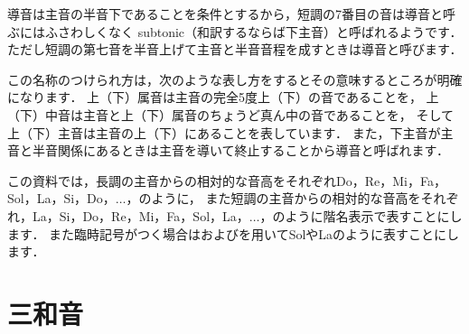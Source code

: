 \documentclass[dvipdfmx,uplatex,b5paper,openany,jbase=12Q,nomag*,textwidth-limit=44%
               ]{gachimuchi}[2020/05/05]
\begin{document}
導音は主音の半音下であることを条件とするから，短調の7番目の音は導音と呼ぶにはふさわしくなく
subtonic（和訳するならば下主音）と呼ばれるようです．
ただし短調の第七音を半音上げて主音と半音音程を成すときは導音と呼びます．

\begin{Music}
  \nostartrule%
  \Startpiece%
  \Notes%
  \en%
  \endpiece%
  \Startpiece%
  \Notes%
  \en%
  \endpiece%
\end{Music}

この名称のつけられ方は，次のような表し方をするとその意味するところが明確になります．
上（下）属音は主音の完全5度上（下）の音であることを，
上（下）中音は主音と上（下）属音のちょうど真ん中の音であることを，
そして上（下）主音は主音の上（下）にあることを表しています．
また，下主音が主音と半音関係にあるときは主音を導いて終止することから導音と呼ばれます．
\begin{Music}
  \nostartrule%
  \Startpiece%
  \Notes%
  \en%
  \endpiece%
\end{Music}

この資料では，長調の主音からの相対的な音高をそれぞれDo，Re，Mi，Fa，Sol，La，Si，Do，$\ldots$，のように，
また短調の主音からの相対的な音高をそれぞれ，La，Si，Do，Re，Mi，Fa，Sol，La，$\ldots$，のように階名表示で表すことにします．
また臨時記号がつく場合は\txSharp および\txFlat を用いてSol\aSharp やLa\aFlat のように表すことにします．

\section{三和音}
\end{document}
